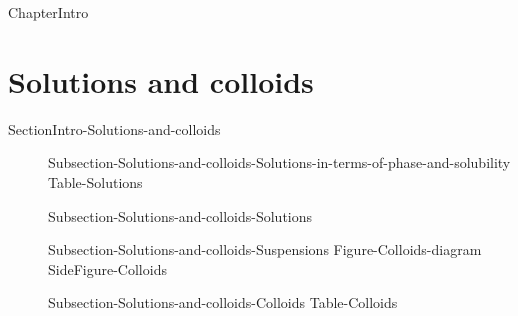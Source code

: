 \documentclass[main.tex]{subfiles}
\newcommand\chapterlabel{Ch-solutions}\setcounter{figurenewcounter}{0}\setcounter{tablenewcounter}{0}\setcounter{formulanewcounter}{0}\chapterpicture{../{\chapterlabel}/figure1}\chapterpicturelabel{PxFuel}
\begin{document}
  


{ChapterIntro}


%
%
%
%
%



\section{Solutions and colloids}{SectionIntro-Solutions-and-colloids}
\sloppy \begin{description}
\item[] {Subsection-Solutions-and-colloids-Solutions-in-terms-of-phase-and-solubility}
{Table-Solutions}
\item[] {Subsection-Solutions-and-colloids-Solutions}
\item[] {Subsection-Solutions-and-colloids-Suspensions}
{Figure-Colloids-diagram}   
{SideFigure-Colloids}
\item[] {Subsection-Solutions-and-colloids-Colloids}
{Table-Colloids}
\end{description}
\end{document}
